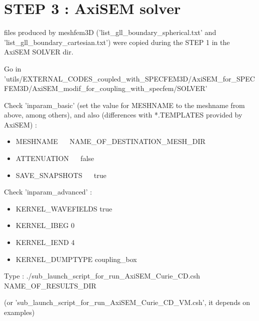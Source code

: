 \documentclass[11pt]{article}
\begin{document}
\section{STEP 3 : AxiSEM solver}

 files produced by meshfem3D ('list\_gll\_boundary\_spherical.txt' and 'list\_gll\_boundary\_cartesian.txt') were copied during the STEP 1 in the AxiSEM SOLVER dir.

\medskip

\noindent Go in {\scriptsize 'utils/EXTERNAL\_CODES\_coupled\_with\_SPECFEM3D/AxiSEM\_for\_SPECFEM3D/AxiSEM\_modif\_for\_coupling\_with\_specfem/SOLVER'}

\medskip

\noindent Check 'inparam\_basic' (set the value for MESHNAME to the meshname from above, among others), and also (differences with *.TEMPLATES provided
by AxiSEM) :

\begin{itemize}

\item[\textbullet] MESHNAME            ~~ NAME\_OF\_DESTINATION\_MESH\_DIR
\item[\textbullet] ATTENUATION         ~~ false
\item[\textbullet] SAVE\_SNAPSHOTS     ~~ true

\end{itemize}

\medskip

\noindent Check 'inparam\_advanced' :

\begin{itemize}

\item[\textbullet] KERNEL\_WAVEFIELDS   true
\item[\textbullet] KERNEL\_IBEG         0
\item[\textbullet] KERNEL\_IEND         4
\item[\textbullet] KERNEL\_DUMPTYPE     coupling\_box

\end{itemize}

\medskip

\noindent Type : ./sub\_launch\_script\_for\_run\_AxiSEM\_Curie\_CD.csh NAME\_OF\_RESULTS\_DIR

\smallskip

\noindent (or 'sub\_launch\_script\_for\_run\_AxiSEM\_Curie\_CD\_VM.csh', it depends on examples)

\medskip
\end{document}
